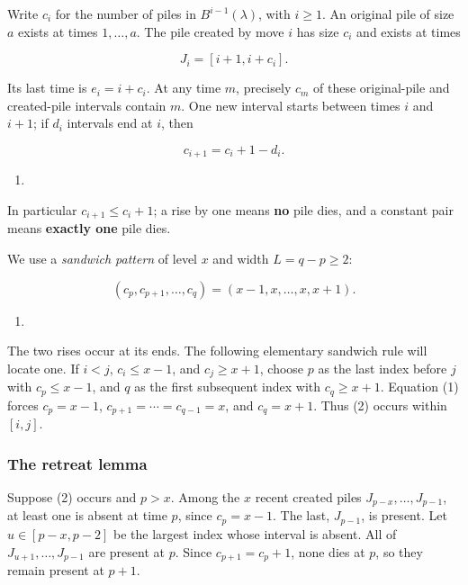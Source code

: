 \documentclass[11pt,a4paper]{article}
\providecommand{\tightlist}{\setlength{\itemsep}{0pt}\setlength{\parskip}{0pt}}
\begin{document}
Write \(c_i\) for the number of piles in \(B^{i-1}(\lambda)\), with \(i\ge1\). An original pile of size \(a\) exists at times \(1,\ldots,a\). The pile created by move \(i\) has size \(c_i\) and exists at times

\[
J_i=[i+1,i+c_i].
\]

Its last time is \(e_i=i+c_i\). At any time \(m\), precisely \(c_m\) of these original-pile and created-pile intervals contain \(m\). One new interval starts between times \(i\) and \(i+1\); if \(d_i\) intervals end at \(i\), then

\[
c_{i+1}=c_i+1-d_i.
\]

\begin{enumerate}
\def\labelenumi{(\arabic{enumi})}
\tightlist
\item
\end{enumerate}

In particular \(c_{i+1}\le c_i+1\); a rise by one means \textbf{no} pile dies, and a constant pair means \textbf{exactly one} pile dies.

We use a \emph{sandwich pattern} of level \(x\) and width \(L=q-p\ge2\):

\[
(c_p,c_{p+1},\ldots,c_q)=(x-1,x,\ldots,x,x+1).
\]

\begin{enumerate}
\def\labelenumi{(\arabic{enumi})}
\setcounter{enumi}{1}
\tightlist
\item
\end{enumerate}

The two rises occur at its ends. The following elementary sandwich rule will locate one. If \(i<j\), \(c_i\le x-1\), and \(c_j\ge x+1\), choose \(p\) as the last index before \(j\) with \(c_p\le x-1\), and \(q\) as the first subsequent index with \(c_q\ge x+1\). Equation (1) forces \(c_p=x-1\), \(c_{p+1}=\cdots=c_{q-1}=x\), and \(c_q=x+1\). Thus (2) occurs within \([i,j]\).

\subsubsection{The retreat lemma}\label{the-retreat-lemma}

Suppose (2) occurs and \(p>x\). Among the \(x\) recent created piles \(J_{p-x},\ldots,J_{p-1}\), at least one is absent at time \(p\), since \(c_p=x-1\). The last, \(J_{p-1}\), is present. Let \(u\in[p-x,p-2]\) be the largest index whose interval is absent. All of \(J_{u+1},\ldots,J_{p-1}\) are present at \(p\). Since \(c_{p+1}=c_p+1\), none dies at \(p\), so they remain present at \(p+1\).
\end{document}
